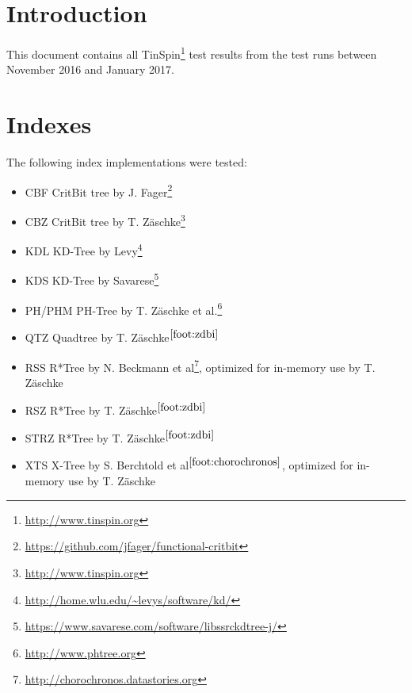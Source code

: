 \documentclass{vldb}
\makeatletter
\def\doi#1{\gdef\@doi{#1}}\def\@doi{}
\makeatother
\begin{document}




\maketitle

\section{Introduction}

This document contains all TinSpin\footnote{\url{http://www.tinspin.org}} test results from the test runs between November 2016 and January 2017.

\section{Indexes}

The following index implementations were tested:

\begin{itemize}
	\item CBF CritBit tree by J. Fager\footnote{\url{https://github.com/jfager/functional-critbit}}
	\item CBZ CritBit tree by T. Z\"{a}schke\footnote{\url{http://www.tinspin.org}\label{foot:zdbi}}
	\item KDL KD-Tree by Levy\footnote{\url{http://home.wlu.edu/~levys/software/kd/}}
	\item KDS KD-Tree by Savarese\footnote{\url{https://www.savarese.com/software/libssrckdtree-j/}}
	\item PH/PHM PH-Tree by T. Z\"{a}schke et al.\footnote{\url{http://www.phtree.org}}
	\item QTZ Quadtree by T. Z\"{a}schke$^{\ref{foot:zdbi}}$
	\item RSS R*Tree by N. Beckmann et al\footnote{\url{http://chorochronos.datastories.org}\label{foot:chorochronos}}, optimized for in-memory use by T. Z\"{a}schke
	\item RSZ R*Tree by T. Z\"{a}schke$^{\ref{foot:zdbi}}$
	\item STRZ R*Tree by T. Z\"{a}schke$^{\ref{foot:zdbi}}$
	\item XTS X-Tree by S. Berchtold et al$^{\ref{foot:chorochronos}}$, optimized for in-memory use by T. Z\"{a}schke
\end{itemize}
\end{document}
